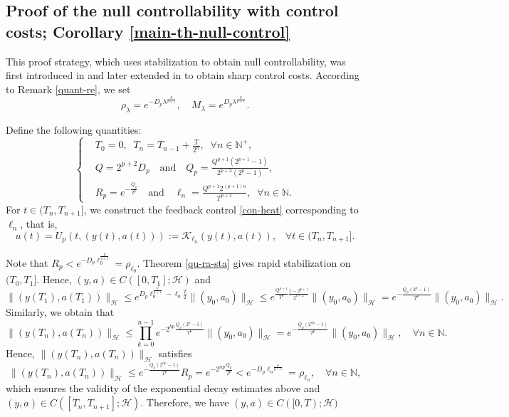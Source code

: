 \documentclass[a4paper]{article}
\numberwithin{equation}{section}
\begin{document}
\begin{appendices}
\section{\large{Proof of the null controllability with control costs; Corollary \ref{main-th-null-control}}}
This proof strategy, which uses stabilization to obtain null controllability, was first introduced in \cite{CN} and later extended in \cite{CX, X} to obtain sharp control costs.
According to Remark \ref{quant-re}, we set
$$\rho_{\lambda}=e^{-D_p\lambda^{\frac{p}{p+1}}}, \quad M_{\lambda}=e^{D_p\lambda^{\frac{p}{p+1}}}.$$ 

Define the following quantities:
\begin{equation*}\left\{  \begin{aligned}
& {T}_0 = 0,\;\;{T}_n = {T}_{n-1 } + \frac{T}{2^{n }},\;\;\forall n \in \mathbb{N}^+,\\
&Q=2^{p+2}D_p\quad\text{and}\quad Q_p=\frac{Q^{p+1}(2^{p+1}-1)}{2^{p+2}(2^p-1)},\\
&R_p= e^{-\frac {Q_p}{T^p}}\quad\text{and}\quad\ell_n = \frac{Q^{p+1}  2^{(p+1)n}}{T^{p+1}},\;\;\forall n \in \mathbb{N}. \end{aligned}\right.
\end{equation*}
For $t\in({T}_{n}, {T}_{n+1}]$, we construct the feedback control \eqref{con-heat} corresponding to $\ell_n$, that is,
\begin{equation}\label{c-1}
u(t)=U_p(t,(y(t),a(t))):=\mathcal{K}_{\ell_n}(y(t),a(t)),\;\;\;\forall t\in (T_n,T_{n+1}].
\end{equation}

Note that $R_p<  e^{-D_p\ell_0^{\frac{p}{p+1}}}=\rho_{\ell_0}$. Theorem \ref{qu-ra-sta} gives rapid stabilization on $({T}_{0}, {T}_{1}]$. Hence, $(y,a)\in C([0,T_1];\mathcal H)$ and
\begin{equation*}
\|(y(T_1),a(T_1))\|_{\mathcal{H}}\le e^{D_p\ell_0^{\frac{p}{p+1}}-\ell_0\frac{T}{2}} \|(y_0,a_0)\|_{\mathcal{H}}\le e^{\frac{Q^{p+1}}{T^p}\frac{1-2^{p+1}}{2^{p+2}}} \|(y_0,a_0)\|_{\mathcal{H}}=e^{-\frac{Q_p(2^p-1)}{T^p}} \|(y_0,a_0)\|_{\mathcal{H}}.
\end{equation*}
Similarly, we obtain that
$$\|(y(T_n),a(T_n))\|_{\mathcal{H}}\le \prod_{k=0}^{n-1}e^{-2^{kp}\frac{Q_p(2^p-1)}{T^p}}\|(y_0,a_0)\|_{\mathcal{H}}=e^{-\frac{Q_p(2^{np}-1)}{T^p}}\|(y_0,a_0)\|_{\mathcal{H}},\quad\forall n\in \mathbb{N}.$$
Hence, $\|(y(T_n),a(T_n))\|_{\mathcal{H}}$ satisfies
\begin{equation}\label{yt69000}
\|(y(T_n),a(T_n))\|_{\mathcal{H}}\le e^{-\frac{Q_p(2^{np}-1)}{T^p}}R_p= e^{-2^{np}\frac{Q_p}{T^p}}< e^{-D_p{\ell_n}^{\frac{p}{p+1}}}=\rho_{\ell_n},\quad\forall n\in \mathbb{N},\end{equation}
which ensures the validity of the exponential decay estimates above and $(y,a)\in C([T_n,T_{n+1}];\mathcal H)$. Therefore, we have $(y,a)\in C([0,T);\mathcal H)$


\end{appendices}
\end{document}
